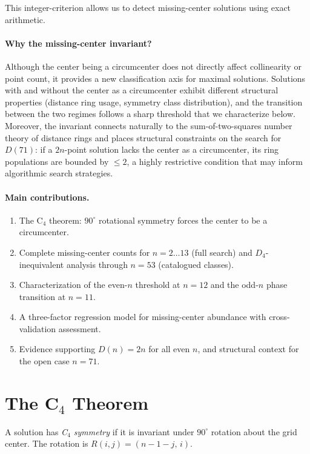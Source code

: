 \documentclass[11pt,a4paper]{article}
\theoremstyle{plain}
\theoremstyle{definition}
\begin{document}
\noindent This integer-criterion allows us to detect missing-center solutions using exact arithmetic.

\paragraph{Why the missing-center invariant?} Although the center being a circumcenter does not directly affect collinearity or point count, it provides a new classification axis for maximal solutions. Solutions with and without the center as a circumcenter exhibit different structural properties (distance ring usage, symmetry class distribution), and the transition between the two regimes follows a sharp threshold that we characterize below. Moreover, the invariant connects naturally to the sum-of-two-squares number theory of distance rings and places structural constraints on the search for $D(71)$: if a $2n$-point solution lacks the center as a circumcenter, its ring populations are bounded by $\le 2$, a highly restrictive condition that may inform algorithmic search strategies.

\paragraph{Main contributions.}
\begin{enumerate}[nosep]
\item The C$_4$ theorem: $90^\circ$ rotational symmetry forces the center to be a circumcenter.
\item Complete missing-center counts for $n=2\dots13$ (full search) and $D_4$-inequivalent analysis through $n=53$ (catalogued classes).
\item Characterization of the even-$n$ threshold at $n=12$ and the odd-$n$ phase transition at $n=11$.
\item A three-factor regression model for missing-center abundance with cross-validation assessment.
\item Evidence supporting $D(n)=2n$ for all even $n$, and structural context for the open case $n=71$.
\end{enumerate}


\section{The C$_4$ Theorem}
\label{sec:c4}

A solution has \emph{C$_4$ symmetry} if it is invariant under $90^\circ$ rotation about the grid center. The rotation is $R(i,j) = (n-1-j,\, i)$.
\end{document}
